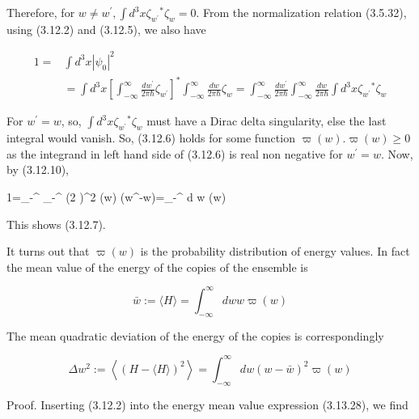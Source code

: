 \documentclass{article}
\begin{document}
Therefore, for $w \neq w^{\prime}, \int d^{3} x \zeta_{w^{\prime}}{ }^{*} \zeta_{w}=0$. From the normalization relation (3.5.32), using (3.12.2) and (3.12.5), we also have
 
\begin{align*}
1= & \int d^{3} x\left|\psi_{0}\right|^{2}  \tag{3.12.10}\\
& =\int d^{3} x\left[\int_{-\infty}^{\infty} \frac{d w^{\prime}}{2 \pi \hbar} \zeta_{w^{\prime}}\right]^{*} \int_{-\infty}^{\infty} \frac{d w}{2 \pi \hbar} \zeta_{w}=\int_{-\infty}^{\infty} \frac{d w^{\prime}}{2 \pi \hbar} \int_{-\infty}^{\infty} \frac{d w}{2 \pi \hbar} \int d^{3} x \zeta_{w^{\prime}}{ }^{*} \zeta_{w}
\end{align*}
 

For $w^{\prime}=w$, so, $\int d^{3} x \zeta_{w^{\prime}}{ }^{*} \zeta_{w}$ must have a Dirac delta singularity, else the last integral would vanish. So, (3.12.6) holds for some function $\varpi(w) . \varpi(w) \geq 0$ as the integrand in left hand side of (3.12.6) is real non negative for $w^{\prime}=w$. Now, by (3.12.10),
 
1=\int_{-\infty}^{\infty}  \int_{-\infty}^{\infty} (2 \pi \hbar)^{2} \varpi(w) \delta\left(w^{\prime}-w\right)=\int_{-\infty}^{\infty} d w \varpi(w)
 

This shows (3.12.7).

It turns out that $\varpi(w)$ is the probability distribution of energy values. In fact the mean value of the energy of the copies of the ensemble is
 
\begin{equation*}
\bar{w}:=\langle H\rangle=\int_{-\infty}^{\infty} d w w \varpi(w) \tag{3.12.11}
\end{equation*}
 

The mean quadratic deviation of the energy of the copies is correspondingly
 
\begin{equation*}
\Delta w^{2}:=\left\langle(H-\langle H\rangle)^{2}\right\rangle=\int_{-\infty}^{\infty} d w(w-\bar{w})^{2} \varpi(w) \tag{3.12.12}
\end{equation*}
 

Proof. Inserting (3.12.2) into the energy mean value expression (3.13.28), we find
 
\end{document}
